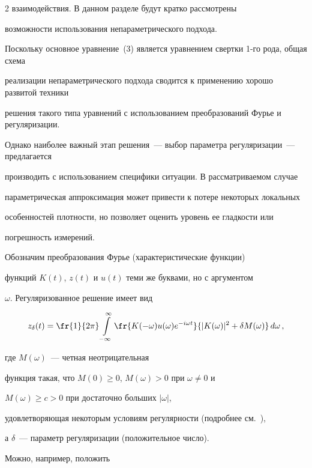 \begin{multicols}{2}
взаимодействия. В данном разделе будут кратко рассмотрены


возможности использования непараметрического подхода.





Поскольку основное уравнение~(3) является уравнением свертки 1-го рода, общая схема


реализации непараметрического подхода сводится к применению хорошо развитой техники


решения такого типа уравнений с использованием преобразований Фурье и регуляризации.


Однако наиболее важный этап решения~--- выбор параметра регуляризации~--- предлагается


производить с использованием специфики ситуации. В рас\-смат\-ри\-ва\-емом случае


параметрическая аппроксимация может привести к потере некоторых локальных


особенностей плотности, но позволяет оценить уровень ее гладкости или


погрешность измерений.





Обозначим преобразования Фурье (характеристические функции)


функций $K(t)$, $z(t)$ и $u(t)$ теми же буквами, но с аргументом


$\omega$. Регуляризованное решение имеет вид





\noindent


$$


z_\delta(t)=\fr{1}{2\pi}\int\limits_{-\infty}^\infty


\fr{K(-\omega)u(\omega)e^{-i\omega t}}{|K(\omega)|^2+\delta


M(\omega)}\,d\omega\,,


$$ 


где $M(\omega)$~--- четная неотрицательная


функция такая, что $M(0)\ge0$, $M(\omega)>0$ при $\omega\not=0$ и


$M(\omega)\ge c>0$ при достаточно больших $|\omega|$,


удов\-ле\-тво\-ря\-ющая некоторым условиям регулярности (подробнее см.~\cite{7us}), 


а $\delta$~--- параметр регуляризации (положительное число).


Можно, например, положить 






\end{multicols}
